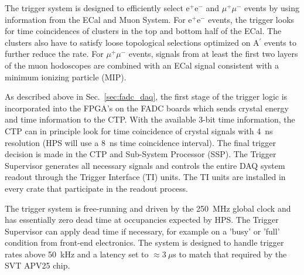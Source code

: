 

The trigger system is designed to efficiently select e$^{+}$e$^{-}$ and $\mu^{+}\mu^{-}$ events by 
using information from the ECal and Muon System. For e$^{+}$e$^{-}$ events, the trigger looks for time coincidences of clusters in the top and bottom half of the ECal. The clusters also have to satisfy loose topological selections optimized on A$^{\prime}$ events to further reduce the rate. For $\mu^{+}\mu^{-}$ events, signals from at least the first two layers of the muon hodoscopes are combined with an ECal signal consistent with a minimum ionizing particle (MIP). 

As described above in Sec.~\ref{sec:fadc_daq}, the first stage of the trigger logic is incorporated into the FPGA's on the FADC boards which sends crystal energy and time information to the CTP. With the available 3-bit time information, the CTP can in principle look for time coincidence of crystal signals with 4~ns resolution (HPS will use a 8~ns time coincidence interval). The final trigger decision is made in the CTP and Sub-System Processor (SSP). The Trigger Supervisor generates all necessary signals and controls the entire DAQ system readout through the Trigger Interface (TI) units. The TI units are installed in every crate that participate in the readout process. 

The trigger system is free-running and driven by the 250~MHz global clock and has essentially zero dead time at occupancies expected by HPS. The Trigger Supervisor can apply dead time if necessary, for example on a 'busy' or 'full' condition from front-end electronics. The system is designed to handle trigger rates above 50~kHz and a latency set to $\approx 3~\mu$s to match that required by the SVT APV25 chip. 


 




